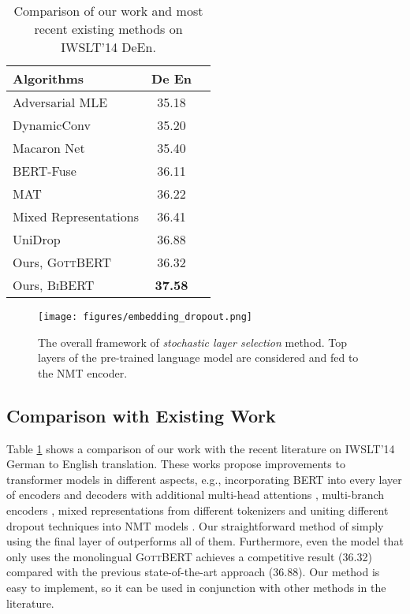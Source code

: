 \documentclass[11pt]{article}
\begin{document}
\begin{table}[ht]
\begin{small}
\centering
\begin{tabular}{l|cc}

\hline
Algorithms & De  En \\
\hline
Adversarial MLE \citep{WangG019} & 35.18 \\
DynamicConv\citep{wu2018pay} & 35.20 \\
Macaron Net \citep{lu*2020understanding} & 35.40\\
BERT-Fuse \citep{Zhu2020Incorporating} & 36.11 \\
MAT \citep{fan2020multi} & 36.22  \\
Mixed Representations \citep{wu2020sequence}  & 36.41 \\
UniDrop \citep{wu-etal-2021-unidrop}  & 36.88 \\
\hline
Ours, \textsc{GottBERT} & 36.32 \\
Ours, \textsc{BiBERT} & \bf 37.58 \\

\hline

\end{tabular}
\caption{Comparison of our work and most recent existing methods on IWSLT'14 DeEn.}
\label{tab:iwslt14-previous}
\end{small}
\end{table}

\begin{figure*}[ht]
    \centering
    \texttt{[image: figures/embedding\_dropout.png]}
    \caption{The overall framework of \textit{stochastic layer selection} method. Top  layers of the  pre-trained language model are considered and fed to the NMT encoder. }
    \label{fig:dropout}
\end{figure*}

\subsection{Comparison with Existing Work}
Table \ref{tab:iwslt14-previous} shows a comparison of our work with the recent literature on IWSLT'14 German to English translation. These works propose improvements to transformer models in different aspects, e.g., incorporating BERT into every layer of encoders and decoders with additional multi-head attentions \citep{Zhu2020Incorporating}, multi-branch encoders \citep{fan2020multi}, mixed representations from different tokenizers \citep{wu2020sequence} and uniting different dropout techniques into NMT models \citep{wu-etal-2021-unidrop}. Our straightforward method of simply using the final layer of  outperforms all of them. Furthermore, even the model that only uses the monolingual \textsc{GottBERT} achieves a competitive result (36.32) compared with the previous state-of-the-art approach (36.88). Our method is easy to implement, so it can be used in conjunction with other methods in the literature.
\end{document}
